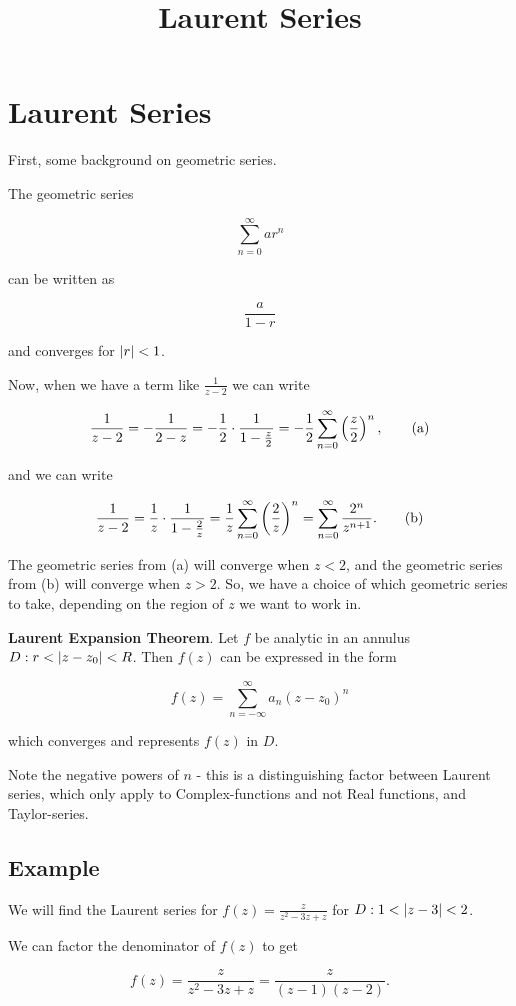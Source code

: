 \documentclass{article}
\title{Laurent Series}
\begin{document}
\section{Laurent Series}

First, some background on geometric series.

The geometric series

\[ \sum_{n=0}^{\infty} ar^n \]

can be written as

\[ \frac{a}{1 - r} \]

and \@{converges} for $\left| r \right| < 1$.

Now, when we have a term like $\frac{1}{z-2}$ we can write

\[ \frac{1}{z -2} = -\frac{1}{2 - z} = - \frac{1}{2} \cdot \frac{1}{1 - \frac{z}{2} } = - \frac{1}{2}\sum_{n=0}^{\infty} \left(\frac{z}{2}\right)^n, \tag{a} \]

and we can write

\[ \frac{1}{z - 2} = \frac{1}{z} \cdot \frac{1}{1 - \frac{2}{z}} = \frac{1}{z} \sum_{n=0}^{\infty} \left(\frac{2}{z}\right)^n = \sum_{n=0}^{\infty} \frac{2^n}{z^{n+1}}. \tag{b} \]

The geometric series from (a) will converge when $z < 2$, and the geometric series from (b) will converge when $z > 2$. So, we have a choice of which geometric series to take, depending on the region of $z$ we want to work in.

\textbf{Laurent Expansion Theorem}. Let $f$ be \@{analytic} in an annulus $D : r < \left| z - z_0 \right| < R$. Then $f(z)$ can be expressed in the form

\[ f(z) = \sum_{n=-\infty}^{\infty} a_n (z - z_0)^n \]

which converges and represents $f(z)$ in $D$.

Note the negative powers of $n$ - this is a distinguishing factor between Laurent series, which only apply to \@{Complex-functions} and not Real functions, and \@{Taylor-series}.

\subsection{Example}

We will find the Laurent series for $f(z) = \frac{z}{z^2 - 3z + z}$ for $D : 1 < \left| z - 3 \right| < 2$.

We can factor the denominator of $f(z)$ to get

\[ f(z) = \frac{z}{z^2 - 3z + z} = \frac{z}{(z - 1)(z - 2)}. \]
\end{document}
